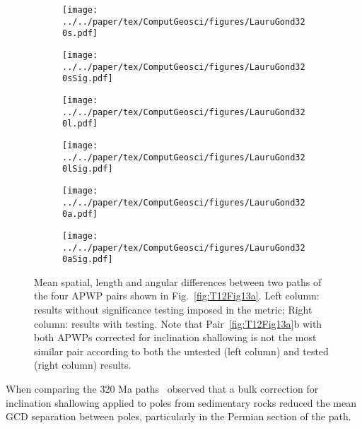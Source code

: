 \begin{figure*}[tbp]
  \captionsetup[subfigure]{singlelinecheck=off,justification=raggedright,aboveskip=-6pt,belowskip=-6pt}
  \centering
  \begin{subfigure}[htbp]{.495\textwidth}
    \centering
	\caption{}\label{fig:LGs}
    \texttt{[image: ../../paper/tex/ComputGeosci/figures/LauruGond320s.pdf]}
  \end{subfigure}
  \vspace{.5em}
  \begin{subfigure}[htbp]{.495\textwidth}
    \centering
    \caption{}\label{fig:LGsS}
    \texttt{[image: ../../paper/tex/ComputGeosci/figures/LauruGond320sSig.pdf]}
  \end{subfigure}
  \begin{subfigure}[htbp]{.495\textwidth}
    \centering
    \caption{}\label{fig:LGl}
    \texttt{[image: ../../paper/tex/ComputGeosci/figures/LauruGond320l.pdf]}
  \end{subfigure}
  \vspace{.5em}
  \begin{subfigure}[htbp]{.495\textwidth}
    \centering
    \caption{}\label{fig:LGlS}
    \texttt{[image: ../../paper/tex/ComputGeosci/figures/LauruGond320lSig.pdf]}
  \end{subfigure}
  \begin{subfigure}[htbp]{.495\textwidth}
    \centering
    \caption{}\label{fig:LGa}
    \texttt{[image: ../../paper/tex/ComputGeosci/figures/LauruGond320a.pdf]}
  \end{subfigure}
  \begin{subfigure}[htbp]{.495\textwidth}
    \centering
    \caption{}\label{fig:LGaS}
    \texttt{[image: ../../paper/tex/ComputGeosci/figures/LauruGond320aSig.pdf]}
  \end{subfigure}
\caption[]{Mean spatial, length and angular differences between two paths of the
four APWP pairs shown in Fig.~\ref{fig:T12Fig13a}. Left column: results without
significance testing imposed in the metric; Right column: results with testing.
Note that Pair~\ref{fig:T12Fig13a}b with both APWPs corrected for inclination
shallowing is not the most similar pair according to both the untested (left
column) and tested (right column) results.}\label{fig:LauruG}
\end{figure*}

When comparing the 320 Ma paths~\cite[in their Fig. 13a]{T12}
observed that a bulk correction for inclination shallowing applied to poles from
sedimentary rocks reduced the mean GCD separation between poles, particularly in
the Permian section of the path.

